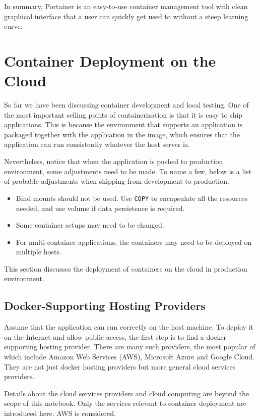 In summary, Portainer is an easy-to-use container management tool with clean graphical interface that a user can quickly get used to without a steep learning curve.

\section{Container Deployment on the Cloud}

So far we have been discussing container development and local testing. One of the most important selling points of containerization is that it is easy to ship applications. This is because the environment that supports an application is packaged together with the application in the image, which ensures that the application can run consistently whatever the host server is. 

Nevertheless, notice that when the application is pushed to production environment, some adjustments need to be made. To name a few, below is a list of probable adjustments when shipping from development to production.

\begin{itemize}
	\item Bind mounts should not be used. Use \verb|COPY| to encapsulate all the resources needed, and use volume if data persistence is required.
	\item Some container setups may need to be changed.
	\item For multi-container applications, the containers may need to be deployed on multiple hosts.
\end{itemize}

This section discusses the deployment of containers on the cloud in production environment.

\subsection{Docker-Supporting Hosting Providers}

Assume that the application can run correctly on the host machine. To deploy it on the Internet and allow public access, the first step is to find a docker-supporting hosting provider. There are many such providers, the most popular of which include Amazon Web Services (AWS), Microsoft Azure and Google Cloud. They are not just docker hosting providers but more general cloud services providers.

Details about the cloud services providers and cloud computing are beyond the scope of this notebook. Only the services relevant to container deployment are introduced here. AWS is considered.

